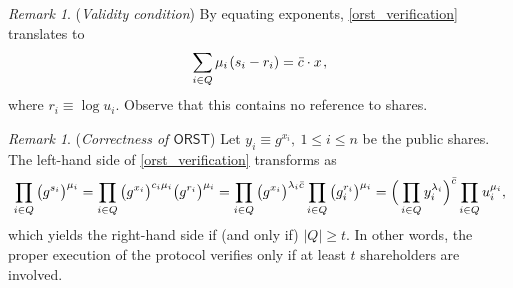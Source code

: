 \documentclass[psamsfonts, reqno]{amsart}
\theoremstyle{definition}
\theoremstyle{remark}
\newtheorem{rem}[thm]{Remark}
\numberwithin{equation}{section}
\begin{document}
\begin{rem}\label{rem_orst_verification_exponents}
(\textit{Validity condition})
By equating exponents,
\eqref{orst_verification} translates to
\vspace{5pt}
\begin{equation}\label{orst_verification_exponents}
\sum_{i \in Q} \mu_i\hspace{1pt} (s_i - r_i) =
\bar{c} \cdot x\hspace{1pt},
\vspace{5pt}
\end{equation}
where $r_i \equiv \log u_i$.
Observe that this contains no reference to shares.
\end{rem}

\begin{rem}\label{orst_correctness}
(\textit{Correctness of $\mathsf{ORST}$})
Let $y_i \equiv g ^ {x_i},\ 1 \le i \le n$
be the public shares.
The left-hand side of \eqref{orst_verification}
transforms as
\vspace{5pt}
\begin{equation*}
\prod_{i \in Q} \big(g ^ {s_i }\big) ^ {\mu_i} =
\prod_{i \in Q} \big(g ^ {x_i}\big) ^ {c_i \mu_i} \big(g ^ {r_i}\big) ^ {\mu_i} =
\prod_{i \in Q} \big(g ^ {x_i}\big) ^ {\lambda_i \bar{c}} \prod_{i \in Q} \big(g_i ^ {r_i}\big) ^ {\mu_i} =
\Big(\prod_{i \in Q} y_i ^ {\lambda_i}\Big) ^ {\bar{c}} \prod_{i \in Q} u_i ^ {\mu_i},
\vspace{5pt}
\end{equation*}
which yields the right-hand side if (and only if) $|Q| \ge t$.
In other words, the proper execution of the protocol verifies
only if at least $t$ shareholders are involved.
\end{rem}
\end{document}

